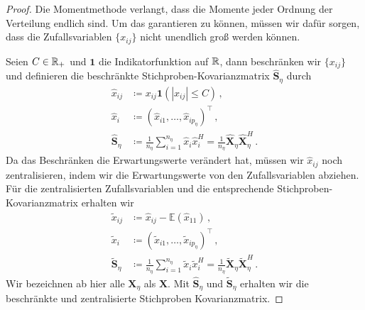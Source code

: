 \documentclass[../Bachelor_LennartKoliwer.tex]{subfiles}
\begin{document}
\begin{proof}
    Die Momentmethode verlangt, dass die Momente jeder Ordnung der Verteilung endlich sind.
    Um das garantieren zu können, müssen wir dafür sorgen, dass die Zufallsvariablen $\{x_{ij}\}$ nicht unendlich groß werden können.

    Seien $C\in\mathbb{R}_+$ und $\mathbf{1}$ die Indikatorfunktion auf $\mathbb{R}$, dann beschränken wir $\{x_{ij}\}$ und definieren die beschränkte Stichproben-Kovarianzmatrix $\hat{\bm{S}}_\eta$ durch
    \begin{align*} 
        \hat{x}_{ij} &\coloneqq x_{ij}\mathbf{1}(|x_{ij}| \leq C)\,,
        \\
        \hat{x}_i &\coloneqq
        \left(\hat{x}_{i1}, \dots, \hat{x}_{ip_\eta}\right)^{\top}\,,
        \\
        \hat{\bm{S}}_\eta
        &\coloneqq \frac{1}{n_\eta} \sum_{i=1}^{n_\eta} \hat{x}_i \hat{x}_i^{H}
        = \frac{1}{n_\eta}\hat{\bm{X}}_\eta \hat{\bm{X}}_\eta^{H}\,.
    \end{align*}
    Da das Beschränken die Erwartungswerte verändert hat, müssen wir $\hat{x}_{ij}$ noch zentralisieren, indem wir die Erwartungswerte von den Zufallsvariablen abziehen.
    Für die zentralisierten Zufallsvariablen und die entsprechende Stichproben-Kovarianzmatrix erhalten wir
    \begin{align*} 
        \tilde{x}_{ij}&\coloneqq \hat{x}_{ij} - \mathbb{E}(\hat{x}_{11})\,, \\
        \tilde{x}_i&\coloneqq
        \left(\tilde{x}_{i1}, \dots, \tilde{x}_{ip_\eta}\right)^{\top}\,, \\
        \tilde{\bm{S}}_\eta&\coloneqq \frac{1}{n_\eta} \sum_{i=1}^{n_\eta} \tilde{x}_i \tilde{x}_i^{H}
        = \frac{1}{n_\eta}\tilde{\bm{X}}_\eta \tilde{\bm{X}}_\eta^{H}\,.
    \end{align*}
    Wir bezeichnen ab hier alle $\bm{X}_\eta$ als $\bm{X}$.
    Mit $\hat{\bm{S}}_\eta$ und $\tilde{\bm{S}}_\eta$ erhalten wir die beschränkte und zentralisierte Stichproben Kovarianzmatrix. 


\end{proof}
\end{document}
